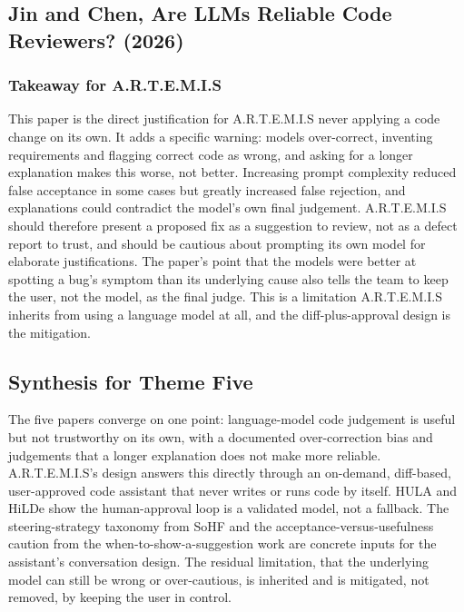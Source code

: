 \documentclass[11pt,a4paper]{report}
\newcommand{\artemis}{A.R.T.E.M.I.S}
\begin{document}
\subsection{Jin and Chen, Are LLMs Reliable Code Reviewers? (2026)}

\subsubsection{Takeaway for \artemis{}}

This paper is the direct justification for \artemis{} never applying a
code change on its own. It adds a specific warning: models over-correct,
inventing requirements and flagging correct code as wrong, and asking
for a longer explanation makes this worse, not better. Increasing
prompt complexity reduced false acceptance in some cases but greatly
increased false rejection, and explanations could contradict the
model's own final judgement. \artemis{} should therefore present a
proposed fix as a suggestion to review, not as a defect report to
trust, and should be cautious about prompting its own model for
elaborate justifications. The paper's point that the models were better
at spotting a bug's symptom than its underlying cause also tells the
team to keep the user, not the model, as the final judge. This is a
limitation \artemis{} inherits from using a language model at all, and
the diff-plus-approval design is the mitigation.

\subsection{Synthesis for Theme Five}

The five papers converge on one point: language-model code judgement is
useful but not trustworthy on its own, with a documented over-correction
bias and judgements that a longer explanation does not make more
reliable. \artemis{}'s design answers this directly through an
on-demand, diff-based, user-approved code assistant that never writes or
runs code by itself. HULA and HiLDe show the human-approval loop is a
validated model, not a fallback. The steering-strategy taxonomy from
SoHF and the acceptance-versus-usefulness caution from the
when-to-show-a-suggestion work are concrete inputs for the assistant's
conversation design. The residual limitation, that the underlying model
can still be wrong or over-cautious, is inherited and is mitigated, not
removed, by keeping the user in control.

\end{document}
